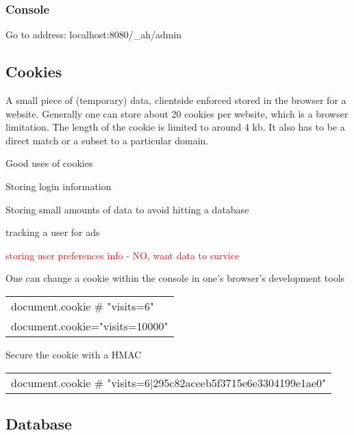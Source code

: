 \documentclass[12pt]{article}
\begin{document}



\subsubsection{Console}

Go to address: localhost:8080/\_ah/admin


\subsection{Cookies}

A small piece of (temporary) data, clientside enforced stored in the browser for a website. Generally one can store about 20 cookies per website, which is a browser limitation. The length of the cookie is limited to around 4 kb. It also has to be a direct match or a subset to a particular domain.

Good uses of cookies
\begin{list}{*}{
\setlength{\itemsep}{0pt}
\setlength{\parsep}{0pt}
\setlength{\topsep}{0pt}
\setlength{\partopsep}{0pt}
\setlength{\leftmargin}{2em}
\setlength{\labelwidth}{1.5em}
\setlength{\labelsep}{0.5em}
}
\item Storing login information
\item Storing small amounts of data to avoid hitting a database
\item tracking a user for ads
\item \textcolor{red}{storing user preferences info - NO, want data to survice}
\end{list}

One can change a cookie within the console in one's browser's development tools

\begin{tabular}{l}
document.cookie $\#$ "visits=6" \\
document.cookie="visits=10000"
\end{tabular}

Secure the cookie with a HMAC



\begin{tabular}{l}
document.cookie $\#$ "visits=6|295c82aceeb5f3715e6e3304199e1ae0" \\
\end{tabular}



\subsection{Database}
\end{document}
